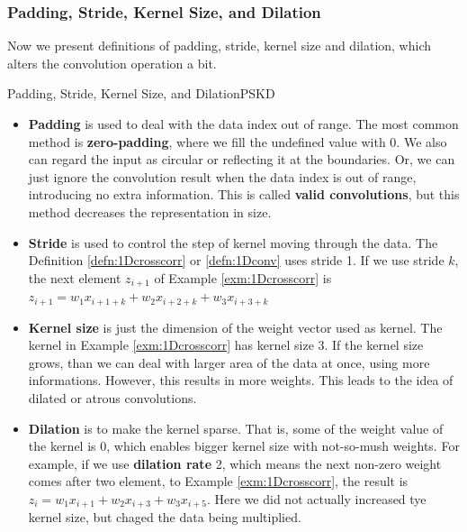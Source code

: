 \documentclass{article}
\begin{document}
        \subsubsection{Padding, Stride, Kernel Size, and Dilation}
            Now we present definitions of padding, stride, kernel size and dilation, which alters the
            convolution operation a bit.
            \begin{defn}{Padding, Stride, Kernel Size, and Dilation}{PSKD}
                \begin{itemize}
                    \item \textbf{Padding} is used to deal with the data index out of range.
                        The most common method is \textbf{zero-padding}, where we fill the undefined value with 0.
                        We also can regard the input as circular or reflecting it at the boundaries. Or, we can just ignore the convolution result
                        when the data index is out of range, introducing no extra information. This is called \textbf{valid convolutions}, but this method decreases the representation in size.
                    \item \textbf{Stride} is used to control the step of kernel moving through the data. The Definition \ref{defn:1Dcrosscorr} or \ref{defn:1Dconv} uses stride 1.
                        If we use stride $k$, the next element $z_{i+1}$ of Example \ref{exm:1Dcrosscorr} is $z_{i+1}=w_1x_{i+1 + k}+w_2x_{i+2 + k}+w_3x_{i+3 + k}$
                        
                    \item \textbf{Kernel size} is just the dimension of the weight vector used as kernel. The kernel in Example \ref{exm:1Dcrosscorr} has kernel size 3. If the kernel size grows, than we can deal with larger area of the data at once, using more informations.
                        However, this results in more weights. This leads to the idea of dilated or atrous convolutions.
                    \item \textbf{Dilation} is to make the kernel sparse. That is, some of the weight value of the kernel is 0, which enables bigger kernel size with not-so-mush weights.
                        For example, if we use \textbf{dilation rate} 2, which means the next non-zero weight comes after two element, to Example \ref{exm:1Dcrosscorr},
                        the result is $z_i=w_1x_{i+1}+w_2x_{i+3}+w_3x_{i+5}$. Here we did not actually increased tye kernel size, but chaged the data being multiplied.
                \end{itemize}
            \end{defn}
\end{document}
